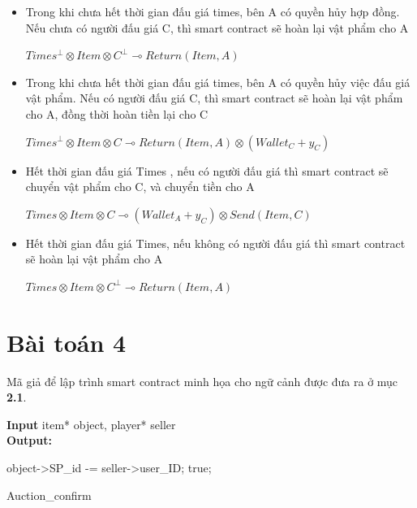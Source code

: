 \documentclass[a4paper]{article}
\begin{document}
\begin{itemize}
    \item Trong khi chưa hết thời gian đấu giá times, bên A có quyền hủy hợp đồng. Nếu chưa có người đấu giá C, thì smart contract sẽ hoàn lại vật phẩm cho A
    \begin{center}
        $Times^{\bot} \otimes Item \otimes C^{\bot} \multimap Return(Item,A)$
    \end{center}
    
    \item Trong khi chưa hết thời gian đấu giá times, bên A có quyền hủy việc đấu giá vật phẩm. Nếu có người đấu giá C, thì smart contract sẽ hoàn lại vật phẩm cho A, đồng thời hoàn tiền lại cho C\\
    \begin{center}
        $Times^{\bot} \otimes Item \otimes C \multimap Return(Item, A) \otimes (Wallet_{C} + y_{C})$ 
    \end{center}
    
    \item Hết thời gian đấu giá Times , nếu có người đấu giá thì smart contract sẽ chuyển vật phẩm cho C, và chuyển tiền cho A\\
    \begin{center}
        $Times \otimes Item \otimes C \multimap (Wallet_{A} + y_{C}) \otimes Send(Item,C)$
    \end{center}
    
    \item Hết thời gian đấu giá Times, nếu không có người đấu giá thì smart contract sẽ hoàn lại vật phẩm cho A\\
    \begin{center}
        $Times \otimes Item \otimes C^{\bot} \multimap Return(Item,A)$
    \end{center}
\end{itemize}

\section{Bài toán 4}
Mã giả để lập trình smart contract minh họa cho ngữ cảnh được đưa ra ở mục \textbf{2.1}.\\



\begin{algorithm}
 \textbf{Input} item* object, player* seller\\
 \textbf{Output:}\\
 \begin{algorithmic}
    \State object->SP\_id  -= seller->user\_ID;
    \State \Return true;
 \end{algorithmic}
 \caption{Auction\_confirm}
\end{algorithm}
\end{document}

